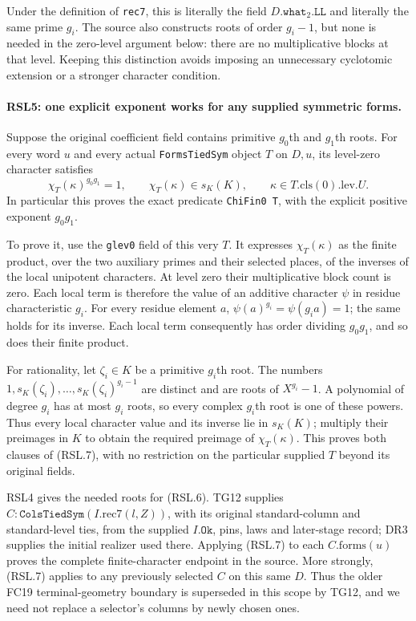 Under the definition of \texttt{rec7}, this is literally the field
$D.\texttt{what}_2.\texttt{LL}$ and literally the same prime $g_i$.
The source also constructs roots of order $g_i-1$, but none is
needed in the zero-level argument below: there are no multiplicative
blocks at that level.  Keeping this distinction avoids imposing an
unnecessary cyclotomic extension or a stronger character condition.

\paragraph{RSL5: one explicit exponent works for any supplied symmetric forms.}
\label{claim:RSL5}
Suppose the original coefficient field contains primitive
$g_0$th and $g_1$th roots.  For every word $u$ and every actual
\texttt{FormsTiedSym} object $T$ on $D,u$, its level-zero character
satisfies
\[
 \chi_T(\kappa)^{g_0g_1}=1,
 \qquad \chi_T(\kappa)\in s_K(K),
 \qquad \kappa\in T.\mathrm{cls}(0).\mathrm{lev}.U.
                                                                  \tag{RSL.7}
\]
In particular this proves the exact predicate \texttt{ChiFin0 T},
with the explicit positive exponent $g_0g_1$.

To prove it, use the \texttt{glev0} field of this very $T$.
It expresses $\chi_T(\kappa)$ as the finite product, over the two
auxiliary primes and their selected places, of the inverses of the
local unipotent characters.  At level zero their multiplicative
block count is zero.  Each local term is therefore the value of
an additive character $\psi$ in residue characteristic $g_i$.
For every residue element $a$,
$\psi(a)^{g_i}=\psi(g_i a)=1$; the same holds for its inverse.
Each local term consequently has order dividing $g_0g_1$, and so
does their finite product.

For rationality, let $\zeta_i\in K$ be a primitive $g_i$th root.
The numbers $1,s_K(\zeta_i),\ldots,s_K(\zeta_i)^{g_i-1}$ are
distinct and are roots of $X^{g_i}-1$.  A polynomial of degree
$g_i$ has at most $g_i$ roots, so every complex $g_i$th root is
one of these powers.  Thus every local character value and its
inverse lie in $s_K(K)$; multiply their preimages in $K$ to obtain
the required preimage of $\chi_T(\kappa)$.  This proves both
clauses of (RSL.7), with no restriction on the particular supplied
$T$ beyond its original fields.

RSL4 gives the needed roots for (RSL.6).  TG12 supplies
$C:\texttt{ColsTiedSym}(I.\mathrm{rec7}(l,Z))$, with its original
standard-column and standard-level ties, from the supplied
$I.\texttt{Ok}$, pins, laws and later-stage record; DR3 supplies
the initial realizer used there.  Applying (RSL.7) to each
$C.\mathrm{forms}(u)$ proves the complete finite-character
endpoint in the source.
More strongly, (RSL.7) applies to any previously selected
$C$ on this same $D$.  Thus the older FC19 terminal-geometry
boundary is superseded in this scope by TG12, and we need not
replace a selector's columns by newly chosen ones.

